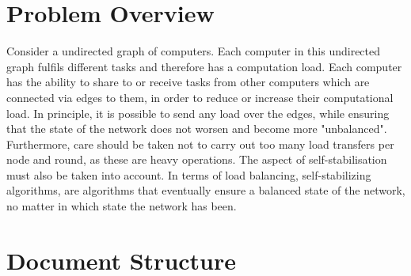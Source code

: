 \section{Problem Overview}
Consider a undirected graph of computers. Each computer in this undirected graph fulfils different tasks and therefore has a computation load. Each computer has the ability to share to or receive tasks from other computers which are connected via edges to them, in order to reduce or increase their computational load. In principle, it is possible to send any load over the edges, while ensuring that the state of the network does not worsen and become more "unbalanced". Furthermore, care should be taken not to carry out too many load transfers per node and round, as these are heavy operations. The aspect of self-stabilisation must also be taken into account. In terms of load balancing, self-stabilizing algorithms, are algorithms that eventually ensure a balanced state of the network, no matter in which state the network has been.
\section{Document Structure}
